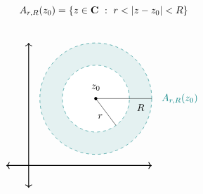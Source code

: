 \begin{discussion}
\begin{itemize}[itemsep=1em]
\[A_{r,R}(z_0) = \left\{z\in \mathbf C\ :\ r < \left\lvert z-z_0\right\rvert<R\right\}\]\\[-1em]
\[\begin{tikzpicture}[scale=0.8]
    \draw[<->,thick] (-1,0)--(5.5,0);
	\draw[<->,thick] (0,-1)--(0,5.5);
	\filldraw[teal,fill opacity=1/10,dashed](3,3) circle (2.5);
	\fill[white](3,3) circle (1.5);
    \draw[teal,dashed](3,3) circle (1.5);
    \draw[](3,3)--(5.5,3);
    \draw[](3,3)--(3.9,1.8);
    \fill (3,3) circle (2pt);
    \node[] at (3,3.5) {$z_0$};
    \node[] at (6.75,3) {\color{teal}$A_{r,R}(z_0)$};
    \node[] at (5,2.6) {$R$};
    \node[] at (3.2,2.2) {$r$};
  \end{tikzpicture}\]
\end{itemize}
\end{discussion}


